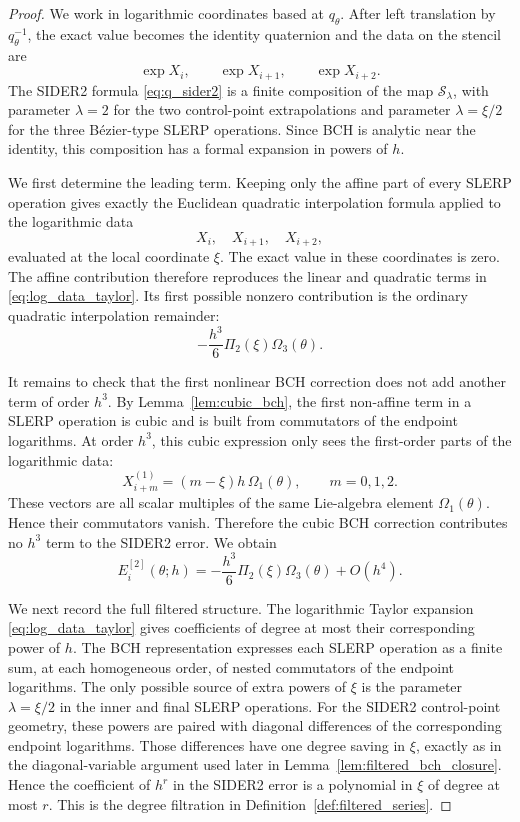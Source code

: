 \documentclass[a4paper,11pt]{article}
\numberwithin{equation}{section}
\theoremstyle{plain}
\theoremstyle{definition}
\theoremstyle{remark}
\begin{document}
\begin{proof}
We work in logarithmic coordinates based at \(q_\theta\).  After left
translation by \(q_\theta^{-1}\), the exact value becomes the identity
quaternion and the data on the stencil are
\[
        \exp X_i,\qquad
        \exp X_{i+1},\qquad
        \exp X_{i+2}.
\]
The SIDER2 formula \eqref{eq:q_sider2} is a finite composition of the map
\(\mathcal S_\lambda\), with parameter \(\lambda=2\) for the two
control-point extrapolations and parameter \(\lambda=\xi/2\) for the three
B\'ezier-type SLERP operations.  Since BCH is analytic near the identity, this
composition has a formal expansion in powers of \(h\).

We first determine the leading term.  Keeping only the affine part of every
SLERP operation gives exactly the Euclidean quadratic interpolation formula
applied to the logarithmic data
\[
        X_i,\quad X_{i+1},\quad X_{i+2},
\]
evaluated at the local coordinate \(\xi\).  The exact value in these
coordinates is zero.  The affine contribution therefore reproduces the
linear and quadratic terms in \eqref{eq:log_data_taylor}.  Its first possible
nonzero contribution is the ordinary quadratic interpolation remainder:
\[
        -\frac{h^3}{6}
        \Pi_2(\xi)\Omega_3(\theta).
\]

It remains to check that the first nonlinear BCH correction does not add
another term of order \(h^3\).  By Lemma~\ref{lem:cubic_bch}, the first
non-affine term in a SLERP operation is cubic and is built from commutators of
the endpoint logarithms.  At order \(h^3\), this cubic expression only sees
the first-order parts of the logarithmic data:
\[
        X_{i+m}^{(1)}
        =
        (m-\xi)h\,\Omega_1(\theta),
        \qquad m=0,1,2.
\]
These vectors are all scalar multiples of the same Lie-algebra element
\(\Omega_1(\theta)\).  Hence their commutators vanish.  Therefore the cubic
BCH correction contributes no \(h^3\) term to the SIDER2 error.  We obtain
\[
        E_i^{[2]}(\theta;h)
        =
        -\frac{h^3}{6}
        \Pi_2(\xi)\Omega_3(\theta)
        +O(h^4).
\]

We next record the full filtered structure.  The logarithmic Taylor expansion
\eqref{eq:log_data_taylor} gives coefficients of degree at most their
corresponding power of \(h\).  The BCH representation expresses each SLERP
operation as a finite sum, at each homogeneous order, of nested commutators of
the endpoint logarithms.  The only possible source of extra powers of \(\xi\)
is the parameter \(\lambda=\xi/2\) in the inner and final SLERP operations.
For the SIDER2 control-point geometry, these powers are paired with diagonal
differences of the corresponding endpoint logarithms.  Those differences have
one degree saving in \(\xi\), exactly as in the diagonal-variable argument used
later in Lemma~\ref{lem:filtered_bch_closure}.  Hence the coefficient of
\(h^r\) in the SIDER2 error is a polynomial in \(\xi\) of degree at most
\(r\).  This is the degree filtration in
Definition~\ref{def:filtered_series}.


\end{proof}
\end{document}
